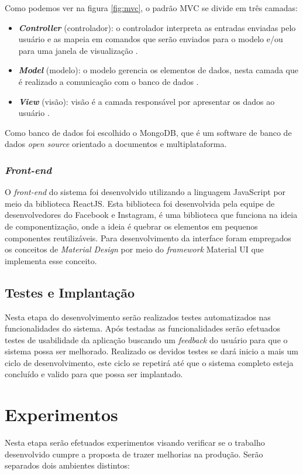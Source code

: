 Como podemos ver na figura \ref{fig:mvc}, o padrão MVC se divide em três camadas:
\begin{itemize}[itemsep=0em]
    \item \textit{\textbf{Controller}} (controlador): o controlador interpreta as entradas enviadas pelo usuário e as mapeia em comandos que serão enviados para o modelo e/ou para uma janela de visualização \cite{dooley2011mvc}.
    \item \textit{\textbf{Model}} (modelo): o modelo gerencia os elementos de dados, nesta camada que é realizado a comunicação com o banco de dados  \cite{dooley2011mvc}.
    \item \textit{\textbf{View}} (visão): visão é a camada responsável por apresentar os dados ao usuário \cite{dooley2011mvc}.
\end{itemize}

Como banco de dados foi escolhido o MongoDB, que é um software de banco de dados \textit{open source} orientado a documentos e multiplataforma. 
\vfill

\subsubsection{\textit{Front-end}}
O \textit{front-end} do sistema foi desenvolvido utilizando a linguagem JavaScript por meio da biblioteca ReactJS. Esta biblioteca foi desenvolvida pela equipe de desenvolvedores do Facebook e Instagram, é uma biblioteca que funciona na ideia de componentização, onde a ideia é quebrar os elementos em pequenos componentes reutilizáveis. Para desenvolvimento da interface foram empregados os conceitos de \textit{Material Design} por meio do \textit{framework} Material UI que implementa esse conceito.

\subsection{Testes e Implantação}
Nesta etapa do desenvolvimento serão realizados testes automatizados nas funcionalidades do sistema. Após testadas as funcionalidades serão efetuados testes de usabilidade da aplicação buscando um \textit{feedback} do usuário para que o sistema possa ser melhorado. Realizado os devidos testes se dará inicio a mais um ciclo de desenvolvimento, este ciclo se repetirá até que o sistema completo esteja concluído e valido para que possa ser implantado.

\section{Experimentos}
Nesta etapa serão efetuados experimentos visando verificar se o trabalho desenvolvido cumpre a proposta de trazer melhorias na produção. Serão separados dois ambientes distintos:

